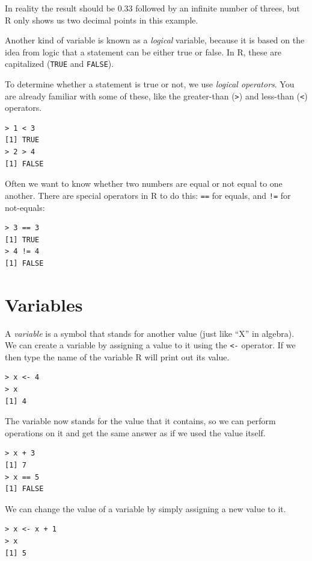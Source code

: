 \documentclass[12pt,]{book}
\begin{document}
In reality the result should be 0.33 followed by an infinite number of threes, but R only shows us two decimal points in this example.

Another kind of variable is known as a \emph{logical} variable, because it is based on the idea from logic that a statement can be either true or false. In R, these are capitalized (\texttt{TRUE} and \texttt{FALSE}).

To determine whether a statement is true or not, we use \emph{logical operators}. You are already familiar with some of these, like the greater-than (\texttt{\textgreater{}}) and less-than (\texttt{\textless{}}) operators.

\begin{verbatim}
> 1 < 3
[1] TRUE
> 2 > 4
[1] FALSE
\end{verbatim}

Often we want to know whether two numbers are equal or not equal to one another. There are special operators in R to do this: \texttt{==} for equals, and \texttt{!=} for not-equals:

\begin{verbatim}
> 3 == 3
[1] TRUE
> 4 != 4
[1] FALSE
\end{verbatim}

\hypertarget{variables}{%
\section{Variables}\label{variables}}

A \emph{variable} is a symbol that stands for another value (just like ``X'' in algebra). We can create a variable by assigning a value to it using the \texttt{\textless{}-} operator. If we then type the name of the variable R will print out its value.

\begin{verbatim}
> x <- 4
> x
[1] 4
\end{verbatim}

The variable now stands for the value that it contains, so we can perform operations on it and get the same answer as if we used the value itself.

\begin{verbatim}
> x + 3
[1] 7
> x == 5
[1] FALSE
\end{verbatim}

We can change the value of a variable by simply assigning a new value to it.

\begin{verbatim}
> x <- x + 1
> x
[1] 5
\end{verbatim}
\end{document}
